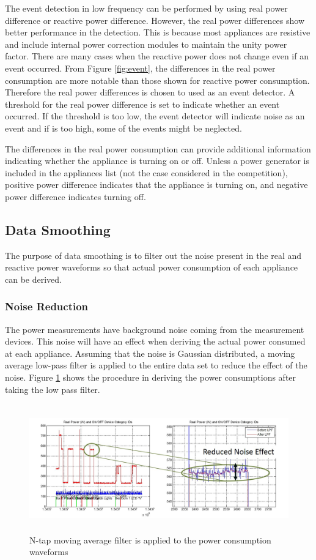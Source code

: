 \documentclass[11pt, letterpaper]{article}
\begin{document}
The event detection in low frequency can be performed by using real power difference or reactive power difference.  However, the real power differences show better performance in the detection.  This is because most appliances are resistive and include internal power correction modules to maintain the unity power factor.  There are many cases when the reactive power does not change even if an event occurred.  From Figure \ref{fig:event}, the differences in the real power consumption are more notable than those shown for reactive power consumption. Therefore the real power differences is chosen to used as an event detector.  A threshold for the real power difference is set to indicate whether an event occurred.  If the threshold is too low, the event detector will indicate noise as an event and if is too high, some of the events might be neglected.

The differences in the real power consumption can provide additional information indicating whether the appliance is turning on or off.  Unless a power generator is included in the appliances list (not the case considered in the competition), positive power difference indicates that the appliance is turning on, and negative power difference indicates turning off.  

\subsection{Data Smoothing}
The purpose of data smoothing is to filter out the noise present in the real and reactive power waveforms so that actual power consumption of each appliance can be derived.
\subsubsection{Noise Reduction}
The power measurements have background noise coming from the measurement devices.  This noise will have an effect when deriving the actual power consumed at each appliance.  Assuming that the noise is Gaussian distributed, a moving average low-pass filter is applied to the entire data set to reduce the effect of the noise. Figure \ref{fig:lpf} shows the procedure in deriving the power consumptions after taking the low pass filter.
\begin{figure}[h]
\centering
\includegraphics[height=5.5cm]{fig/lpf.jpg}
\caption{N-tap moving average filter is applied to the power consumption waveforms}
\label{fig:lpf}
\end{figure}
\end{document}
